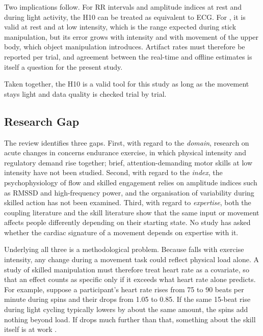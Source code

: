 Two implications follow. For RR intervals and amplitude indices at rest and during light activity, the H10 can be treated as equivalent to ECG. For \al, it is valid at rest and at low intensity, which is the range expected during stick manipulation, but its error grows with intensity and with movement of the upper body, which object manipulation introduces. Artifact rates must therefore be reported per trial, and agreement between the real-time and offline \al{} estimates is itself a question for the present study.

Taken together, the H10 is a valid tool for this study as long as the movement stays light and data quality is checked trial by trial.

\subsection{Research Gap}
\label{sec:bg-gap}

The review identifies three gaps. First, with regard to the \emph{domain}, research on acute changes in \al{} concerns endurance exercise, in which physical intensity and regulatory demand rise together; brief, attention-demanding motor skills at low intensity have not been studied. Second, with regard to the \emph{index}, the psychophysiology of flow and skilled engagement relies on amplitude indices such as RMSSD and high-frequency power, and the organisation of variability during skilled action has not been examined. Third, with regard to \emph{expertise}, both the coupling literature and the skill literature show that the same input or movement affects people differently depending on their starting state. No study has asked whether the cardiac signature of a movement depends on expertise with it.

Underlying all three is a methodological problem. Because \al{} falls with exercise intensity, any change during a movement task could reflect physical load alone. A study of skilled manipulation must therefore treat heart rate as a covariate, so that an effect counts as specific only if it exceeds what heart rate alone predicts. For example, suppose a participant's heart rate rises from 75 to 90 beats per minute during spins and their \al{} drops from 1.05 to 0.85. If the same 15-beat rise during light cycling typically lowers \al{} by about the same amount, the spins add nothing beyond load. If \al{} drops much further than that, something about the skill itself is at work .

